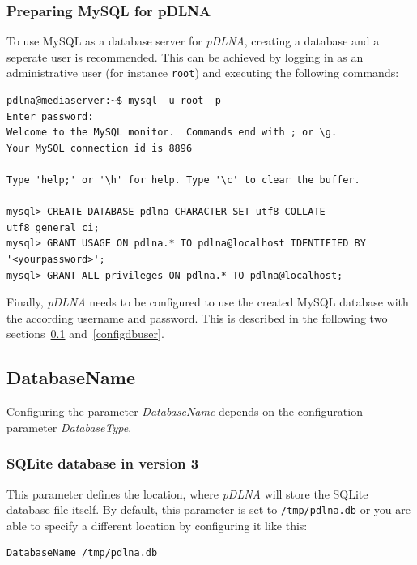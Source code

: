 \documentclass[a4paper,oneside,10pt]{report}
\newenvironment{colframefile}{%
  \begin{Sbox}
    \begin{minipage}{.99\columnwidth}
}{%
  \end{minipage}
  \end{Sbox}
  \begin{center}
    \fcolorbox{black}{Yellow}{\TheSbox}
  \end{center}
}
\begin{document}
\subsubsection{Preparing MySQL for pDLNA}
\label{configdbtype-mysql}

To use MySQL as a database server for {\em pDLNA}, creating a database and a seperate user is recommended. This can be achieved by logging in as an administrative user (for instance \verb|root|) and executing the following commands:

\begin{lstlisting}
pdlna@mediaserver:~$ mysql -u root -p
Enter password:
Welcome to the MySQL monitor.  Commands end with ; or \g.
Your MySQL connection id is 8896

Type 'help;' or '\h' for help. Type '\c' to clear the buffer.

mysql> CREATE DATABASE pdlna CHARACTER SET utf8 COLLATE utf8_general_ci;
mysql> GRANT USAGE ON pdlna.* TO pdlna@localhost IDENTIFIED BY '<yourpassword>';
mysql> GRANT ALL privileges ON pdlna.* TO pdlna@localhost;
\end{lstlisting}

Finally, {\em pDLNA} needs to be configured to use the created MySQL database with the according username and password. This is described in the following two sections~\ref{configdbname} and~\ref{configdbuser}.

\subsection{DatabaseName}
\label{configdbname}

Configuring the parameter {\em DatabaseName} depends on the configuration parameter {\em DatabaseType}.

\subsubsection{SQLite database in version 3}

This parameter defines the location, where {\em pDLNA} will store the SQLite database file itself. By default, this parameter is set to \verb|/tmp/pdlna.db| or you are able to specify a different location by configuring it like this:

\begin{colframefile}
\begin{verbatim}
DatabaseName /tmp/pdlna.db
\end{verbatim}
\end{colframefile}
\end{document}
